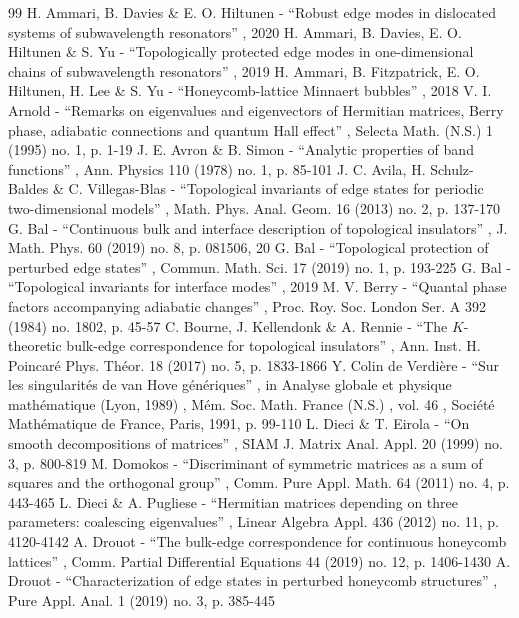 \documentclass[11pt]{article}
\numberwithin{equation}{section}
\theoremstyle{definition}
\begin{document}
\begin{thebibliography}{99}
 H. Ammari, B. Davies \& E. O. Hiltunen - “Robust edge modes in dislocated systems of subwavelength resonators” , 2020
 H. Ammari, B. Davies, E. O. Hiltunen \& S. Yu - “Topologically protected edge modes in one-dimensional chains of subwavelength resonators” , 2019
 H. Ammari, B. Fitzpatrick, E. O. Hiltunen, H. Lee \& S. Yu - “Honeycomb-lattice Minnaert bubbles” , 2018
 V. I. Arnold - “Remarks on eigenvalues and eigenvectors of Hermitian matrices, Berry phase, adiabatic connections and quantum Hall effect” , Selecta Math. (N.S.) 1 (1995) no. 1, p. 1-19
 J. E. Avron \& B. Simon - “Analytic properties of band functions” , Ann. Physics 110 (1978) no. 1, p. 85-101
 J. C. Avila, H. Schulz-Baldes \& C. Villegas-Blas - “Topological invariants of edge states for periodic two-dimensional models” , Math. Phys. Anal. Geom. 16 (2013) no. 2, p. 137-170
 G. Bal - “Continuous bulk and interface description of topological insulators” , J. Math. Phys. 60 (2019) no. 8, p. 081506, 20
 G. Bal - “Topological protection of perturbed edge states” , Commun. Math. Sci. 17 (2019) no. 1, p. 193-225
 G. Bal - “Topological invariants for interface modes” , 2019
 M. V. Berry - “Quantal phase factors accompanying adiabatic changes” , Proc. Roy. Soc. London Ser. A 392 (1984) no. 1802, p. 45-57
 C. Bourne, J. Kellendonk \& A. Rennie - “The $K$-theoretic bulk-edge correspondence for topological insulators” , Ann. Inst. H. Poincaré Phys. Théor. 18 (2017) no. 5, p. 1833-1866
 Y. Colin de Verdière - “Sur les singularités de van Hove génériques” , in Analyse globale et physique mathématique (Lyon, 1989) , Mém. Soc. Math. France (N.S.) , vol. 46 , Société Mathématique de France, Paris, 1991, p. 99-110
 L. Dieci \& T. Eirola - “On smooth decompositions of matrices” , SIAM J. Matrix Anal. Appl. 20 (1999) no. 3, p. 800-819
 M. Domokos - “Discriminant of symmetric matrices as a sum of squares and the orthogonal group” , Comm. Pure Appl. Math. 64 (2011) no. 4, p. 443-465
 L. Dieci \& A. Pugliese - “Hermitian matrices depending on three parameters: coalescing eigenvalues” , Linear Algebra Appl. 436 (2012) no. 11, p. 4120-4142
 A. Drouot - “The bulk-edge correspondence for continuous honeycomb lattices” , Comm. Partial Differential Equations 44 (2019) no. 12, p. 1406-1430
 A. Drouot - “Characterization of edge states in perturbed honeycomb structures” , Pure Appl. Anal. 1 (2019) no. 3, p. 385-445

\end{thebibliography}
\end{document}
